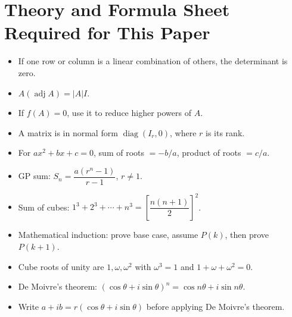 \documentclass[11pt,a4paper]{article}
\begin{document}
\newpage
\section*{Theory and Formula Sheet Required for This Paper}

\begin{tcolorbox}[colback=softgreen,colframe=green!45!black,title={1. Determinants and matrices}]
\begin{itemize}[leftmargin=*]
\item If one row or column is a linear combination of others, the determinant is zero.
\item $A(\operatorname{adj}A)=|A|I$.
\item If $f(A)=0$, use it to reduce higher powers of $A$.
\item A matrix is in normal form $\operatorname{diag}(I_r,0)$, where $r$ is its rank.
\end{itemize}
\end{tcolorbox}

\begin{tcolorbox}[colback=softgreen,colframe=green!45!black,title={2. Algebra, sequences, induction}]
\begin{itemize}[leftmargin=*]
\item For $ax^2+bx+c=0$, sum of roots $=-b/a$, product of roots $=c/a$.
\item GP sum: $S_n=\dfrac{a(r^n-1)}{r-1}$, $r\ne1$.
\item Sum of cubes: $1^3+2^3+\cdots+n^3=\left[\dfrac{n(n+1)}{2}\right]^2$.
\item Mathematical induction: prove base case, assume $P(k)$, then prove $P(k+1)$.
\end{itemize}
\end{tcolorbox}

\begin{tcolorbox}[colback=softgreen,colframe=green!45!black,title={3. Complex numbers and cube roots of unity}]
\begin{itemize}[leftmargin=*]
\item Cube roots of unity are $1,\omega,\omega^2$ with $\omega^3=1$ and $1+\omega+\omega^2=0$.
\item De Moivre's theorem: $(\cos\theta+i\sin\theta)^n=\cos n\theta+i\sin n\theta$.
\item Write $a+ib=r(\cos\theta+i\sin\theta)$ before applying De Moivre's theorem.
\end{itemize}
\end{tcolorbox}
\end{document}
